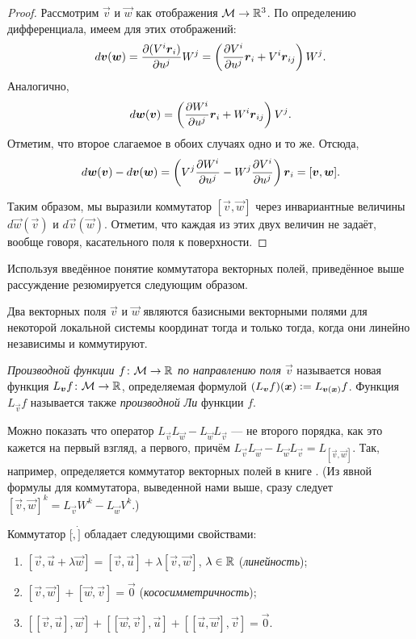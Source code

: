 \begin{proof}
	Рассмотрим $\vec{v}$ и $\vec{w}$ как отображения $\M \to \R^3$. По определению дифференциала, имеем для этих отображений:
	\[
		d\vec{v}(\vec{w}) = \frac{\partial(V^i\vec{r}_i)}{\partial u^j}W^j = \br{\frac{\partial V^i}{\partial u^j}\vec{r}_i + V^i\vec{r}_{ij}}W^j.
	\]
	Аналогично,
	\[
		d\vec{w}(\vec{v}) = \br{\frac{\partial W^i}{\partial u^j}\vec{r}_i + W^i\vec{r}_{ij}}V^j.
	\]
	Отметим, что второе слагаемое в обоих случаях одно и то же. Отсюда,
	\[
		d\vec{w}(\vec{v}) - d\vec{v}(\vec{w}) = \br{V^j\frac{\partial W^i}{\partial u^j} - W^j\frac{\partial V^i}{\partial u^j}}\vec{r}_i = [\vec{v}, \vec{w}].
	\]

	Таким образом, мы выразили коммутатор $[\vec{v}, \vec{w}]$ через инвариантные величины $d\vec{w}(\vec{v})$ и $d\vec{v}(\vec{w})$. Отметим, что каждая из этих двух величин не задаёт, вообще говоря, касательного поля к поверхности.
\end{proof}

Используя введённое понятие коммутатора векторных полей, приведённое выше рассуждение резюмируется следующим образом.

\begin{theorem}
	Два векторных поля $\vec{v}$ и $\vec{w}$ являются базисными векторными полями для некоторой локальной системы координат тогда и только тогда, когда они линейно независимы и коммутируют.
\end{theorem}

\begin{definition}
	\textit{Производной функции $f\colon \M \to \R$ по направлению поля $\vec{v}$} называется новая функция $L_{\vec{v}}f\colon \M \to \R$, определяемая формулой $(L_{\vec{v}}f)(\vec{x}) \vcentcolon = L_{\vec{v}(\vec{x})}f$. Функция $L_{\vec{v}}f$ называется также \textit{производной Ли} функции $f$.
\end{definition}

Можно показать что оператор $L_{\vec{v}}L_{\vec{w}} - L_{\vec{w}}L_{\vec{v}}$ --- не второго порядка, как это кажется на первый взгляд, а первого, причём $L_{\vec{v}}L_{\vec{w}} - L_{\vec{w}}L_{\vec{v}} = L_{[\vec{v}, \vec{w}]}$. Так, например, определяется коммутатор векторных полей в книге \cite{A24}. (Из явной формулы для коммутатора, выведенной нами выше, сразу следует $[\vec{v}, \vec{w}]^k = L_{\vec{v}}W^k - L_{\vec{w}}V^k$.)

\begin{proposition}
	Коммутатор $[\dot, \dot]$ обладает следующими свойствами:
	\begin{enumerate}[nolistsep, label=(\arabic*)]
		\item $[\vec{v}, \vec{u} + \lambda\vec{w}] = [\vec{v}, \vec{u}] + \lambda[\vec{v}, \vec{w}]$, $\lambda \in \R$ (\textit{линейность});
		\item $[\vec{v}, \vec{w}] + [\vec{w}, \vec{v}] = \vec{0}$ (\textit{кососимметричность});
		\item $[[\vec{v}, \vec{u}], \vec{w}] + [[\vec{w}, \vec{v}], \vec{u}] + [[\vec{u}, \vec{w}], \vec{v}] = \vec{0}$.
	\end{enumerate}
\end{proposition}

